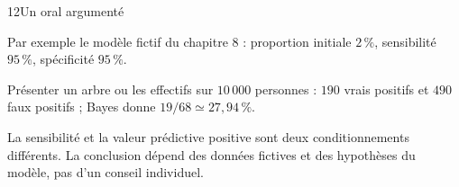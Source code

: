 \begin{corrige}{12}{Un oral argumenté}
\begin{questions}
\item Par exemple le modèle fictif du chapitre 8 : proportion initiale $2\,\%$, sensibilité $95\,\%$, spécificité $95\,\%$.
\item Présenter un arbre ou les effectifs sur $10\,000$ personnes : $190$ vrais positifs et $490$ faux positifs ; Bayes donne $19/68\simeq27{,}94\,\%$.
\item La sensibilité et la valeur prédictive positive sont deux conditionnements différents. La conclusion dépend des données fictives et des hypothèses du modèle, pas d’un conseil individuel.
\end{questions}
\end{corrige}
